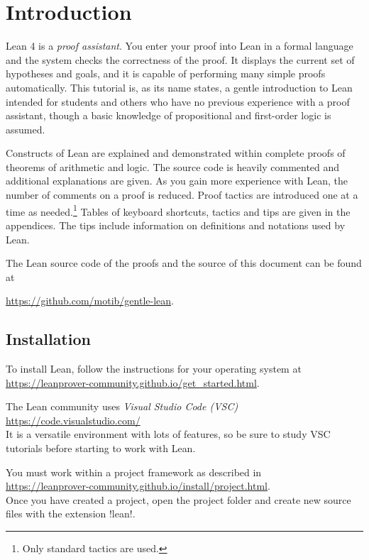 
\section{Introduction}

Lean 4 is a \emph{proof assistant}. You enter your proof into Lean in a formal language and the system checks the correctness of the proof. It displays the current set of hypotheses and goals, and it is capable of performing many simple proofs automatically. This tutorial is, as its name states, a gentle introduction to Lean intended for students and others who have no previous experience with a proof assistant, though a basic knowledge of propositional and first-order logic is assumed.

Constructs of Lean are explained and demonstrated within complete proofs of theorems of arithmetic and logic. The source code is heavily commented and additional explanations are given. As you gain more experience with Lean, the number of comments on a proof is reduced. Proof tactics are introduced one at a time as needed.\footnote{Only standard tactics are used.} Tables of keyboard shortcuts, tactics and tips are given in the appendices. The tips include information on definitions and notations used by Lean.

The Lean source code of the proofs and the \XeLaTeX{} source of this document can be found at

\indnt{}\url{https://github.com/motib/gentle-lean}.

\subsection*{Installation}

To install Lean, follow the instructions for your operating system at\\
\indnt\url{https://leanprover-community.github.io/get_started.html}.

The Lean community uses \emph{Visual Studio Code (VSC)}\\
\indnt{}\url{https://code.visualstudio.com/}\\
It is a versatile environment with lots of features, so be sure to study VSC tutorials before starting to work with Lean.

You must work within a project framework as described in\\ \indnt\url{https://leanprover-community.github.io/install/project.html}.\\ Once you have created a project, open the project folder and create new source files with the extension !lean!.

